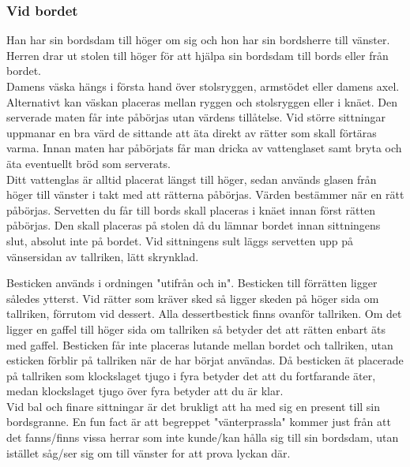\subsubsection*{Vid bordet}
Han har sin bordsdam till höger om sig och hon har sin bordsherre till vänster.
Herren drar ut stolen till höger för att hjälpa sin bordsdam till bords eller från bordet.
\\

Damens väska hängs i första hand över stolsryggen, armstödet eller damens axel.
Alternativt kan väskan placeras mellan ryggen och stolsryggen eller i knäet.
Den serverade maten får inte påbörjas utan värdens tillåtelse.
Vid större sittningar uppmanar en bra värd de sittande att äta direkt av rätter som skall förtäras varma.
Innan maten har påbörjats får man dricka av vattenglaset samt bryta och äta eventuellt bröd som serverats.
\\

Ditt vattenglas är alltid placerat längst till höger, sedan används glasen från höger till vänster i takt med att rätterna påbörjas.
Värden bestämmer när en rätt påbörjas.
Servetten du får till bords skall placeras i knäet innan först rätten påbörjas. Den skall placeras på stolen då du lämnar bordet innan sittningens slut, absolut inte på bordet.
Vid sittningens sult läggs servetten upp på vänsersidan av tallriken, lätt skrynklad.
\\



\newpage

Besticken används i ordningen "utifrån och in".
Besticken till förrätten ligger således ytterst.
Vid rätter som kräver sked så ligger skeden på höger sida om tallriken, förrutom vid dessert.
Alla dessertbestick finns ovanför tallriken.
Om det ligger en gaffel till höger sida om tallriken så betyder det att rätten enbart äts med gaffel.
Besticken får inte placeras lutande mellan bordet och tallriken, utan esticken förblir på tallriken när de har börjat användas. 
Då besticken ät placerade på tallriken som klockslaget tjugo i fyra betyder det att du fortfarande äter,
medan klockslaget tjugo över fyra betyder att du är klar.
\\

Vid bal och finare sittningar är det brukligt att ha med sig en present till sin bordsgranne. 
En fun fact är att begreppet "vänterprassla" kommer just från att det fanns/finns vissa herrar som inte kunde/kan hålla sig till sin bordsdam, 
utan istället såg/ser sig om till vänster for att prova lyckan där.

